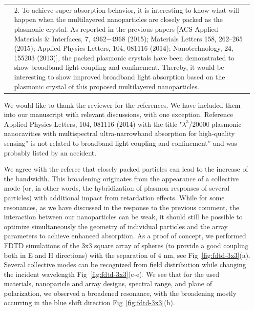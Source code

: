 \documentclass[a4paper]{article}
\begin{document}





\begin{tabular}[!H]{l|p{}}
  \quad & 2. To achieve super-absorption behavior, it is interesting
  to know what will happen when the multilayered nanoparticles are
  closely packed as the plasmonic crystal. As reported in the previous
  papers [ACS Applied Materials \& Interfaces, 7, 4962−4968 (2015);
  Materials Letters 158, 262–265 (2015); Applied Physics Letters, 104,
  081116 (2014); Nanotechnology, 24, 155203 (2013)], the packed
  plasmonic crystals have been demonstrated to show broadband light
  coupling and confinement. Thereby, it would be interesting to show
  improved broadband light absorption based on the plasmonic crystal
  of this proposed multilayered nanoparticles. 
\end{tabular}

We would like to thank the reviewer for the references. We have included them into our manuscript with relevant discussions, with one exception. Reference Applied Physics Letters, 104, 081116 (2014) with the  title "$\lambda^3$/20000
plasmonic nanocavities with multispectral ultra-narrowband absorption
for high-quality sensing'' is not related to broadband light coupling and confinement'' and was
probably listed by an accident.

We agree with the referee that closely packed particles can lead to the increase of the bandwidth. This broadening originates from the appearance of a collective mode (or, in other words, the hybridization of plasmon responses of several particles) with additional impact from retardation effects. While for some resonances, as we have discussed in the response to the previous comment, the interaction between our nanoparticles can be weak, it should still be possible to optimize simultaneously the geometry of individual particles and the array parameters to achieve enhanced absorption. As a proof of concept, we performed FDTD simulations of the 3x3 square array of spheres (to provide a good coupling both in E and
H directions) with the separation of 4 nm, see Fig~\ref{fig:fdtd-3x3}(a). Several collective modes can be recognized
from field distribution while changing the incident wavelength Fig~\ref{fig:fdtd-3x3}(c-e). We see that for the used materials, nanoparicle and array designs, spectral range, and plane of polarization, we observed a broadened resonance, with the broadening mostly occurring in the blue shift direction Fig~\ref{fig:fdtd-3x3}(b). 
\end{document}
